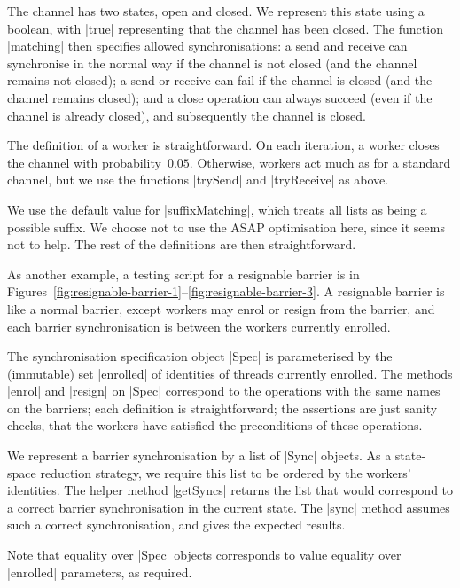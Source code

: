 The channel has two states, open and closed.  We represent this state using a
boolean, with |true| representing that the channel has been closed.  The
function |matching| then specifies allowed synchronisations: a send and
receive can synchronise in the normal way if the channel is not closed (and
the channel remains not closed); a send or receive can fail if the channel is
closed (and the channel remains closed); and a close operation can always
succeed (even if the channel is already closed), and subsequently the channel
is closed.

The definition of a worker is straightforward.  On each iteration, a worker
closes the channel with probability~$0.05$.  Otherwise, workers act much as
for a standard channel, but we use the functions |trySend| and |tryReceive| as
above.

We use the default value for |suffixMatching|, which treats all lists as being
a possible suffix.  We choose not to use the ASAP optimisation here, since it
seems not to help.  The rest of the definitions are then straightforward.



As another example, a testing script for a resignable barrier is in
Figures~\ref{fig:resignable-barrier-1}--\ref{fig:resignable-barrier-3}.  A
resignable barrier is like a normal barrier, except workers may enrol or
resign from the barrier, and each barrier synchronisation is between the
workers currently enrolled.

The synchronisation specification object |Spec| is parameterised by the
(immutable) set |enrolled| of identities of threads currently enrolled.  The
methods |enrol| and |resign| on |Spec| correspond to the operations with the
same names on the barriers; each definition is straightforward; the assertions
are just sanity checks, that the workers have satisfied the preconditions of
these operations.

We represent a barrier synchronisation by a list of |Sync| objects.  As a
state-space reduction strategy, we require this list to be ordered by the
workers' identities.  The helper method |getSyncs| returns the list that would
correspond to a correct barrier synchronisation in the current state.  The
|sync| method assumes such a correct synchronisation, and gives the expected
results. 

Note that equality over |Spec| objects corresponds to value equality over
|enrolled| parameters, as required.  

